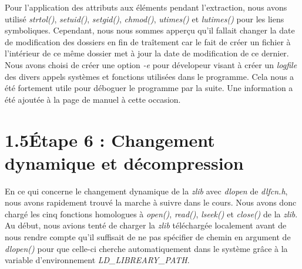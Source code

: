 \documentclass[12pt, a4paper]{report}
\begin{document}
\hspace{0.5cm}Pour l'application des attributs aux éléments pendant l'extraction, nous avons utilisé \textit{strtol()}, \textit{setuid()}, \textit{setgid()}, \textit{chmod()}, \textit{utimes()} et \textit{lutimes()} pour les liens symboliques. Cependant, nous nous sommes apperçu qu'il fallait changer la date de modification des dossiers en fin de traîtement car le fait de créer un fichier à l'intérieur de ce même dossier met à jour la date de modification de ce dernier.\\

\hspace{0.5cm}Nous avons choisi de créer une option \textit{-e} pour dévelopeur visant à créer un \textit{logfile} des divers appels systèmes et fonctions utilisées dans le programme. Cela nous a été fortement utile pour déboguer le programme par la suite. Une information a été ajoutée à la page de manuel à cette occasion.

\section*{\hspace{0.6cm}1.5\hspace{0.6cm}Étape 6 : Changement dynamique et décompression}
\hspace{1cm}En ce qui concerne le changement dynamique de la \textit{zlib} avec \textit{dlopen} de \textit{dlfcn.h}, nous avons rapidement trouvé la marche à suivre dans le cours. Nous avons donc chargé les cinq fonctions homologues à \textit{open()}, \textit{read()}, \textit{lseek()} et \textit{close()} de la \textit{zlib}. Au début, nous avions tenté de charger la \textit{zlib} téléchargée localement avant de nous rendre compte qu'il suffisait de ne pas spécifier de chemin en argument de \textit{dlopen()} pour que celle-ci cherche automatiquement dans le système grâce à la variable d'environnement \textit{LD\_LIBREARY\_PATH}.\\

\hspace{0.5cm}
\end{document}
